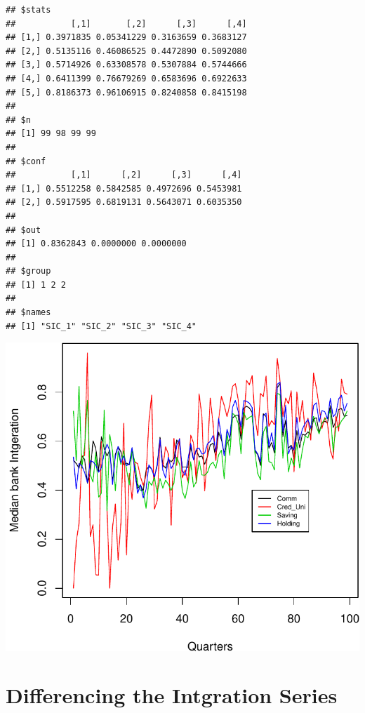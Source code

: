 \documentclass[11pt,]{article}
\begin{document}
\begin{verbatim}
## $stats
##           [,1]       [,2]      [,3]      [,4]
## [1,] 0.3971835 0.05341229 0.3163659 0.3683127
## [2,] 0.5135116 0.46086525 0.4472890 0.5092080
## [3,] 0.5714926 0.63308578 0.5307884 0.5744666
## [4,] 0.6411399 0.76679269 0.6583696 0.6922633
## [5,] 0.8186373 0.96106915 0.8240858 0.8415198
## 
## $n
## [1] 99 98 99 99
## 
## $conf
##           [,1]      [,2]      [,3]      [,4]
## [1,] 0.5512258 0.5842585 0.4972696 0.5453981
## [2,] 0.5917595 0.6819131 0.5643071 0.6035350
## 
## $out
## [1] 0.8362843 0.0000000 0.0000000
## 
## $group
## [1] 1 2 2
## 
## $names
## [1] "SIC_1" "SIC_2" "SIC_3" "SIC_4"
\end{verbatim}

\begin{center}\includegraphics{AC_US_Bank_Int_Results_1_files/figure-latex/SIC_Categ-1} \end{center}

\section{Differencing the Intgration
Series}\label{differencing-the-intgration-series}
\end{document}
